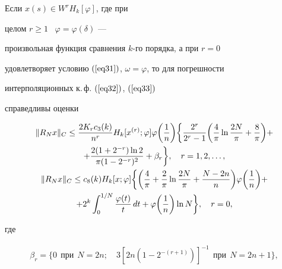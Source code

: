\begin{thm}\label{th4}


Если $x(s)\in W^rH_k[\varphi]$, где при


целом $r\geq1$ \ $\varphi=\varphi(\delta)$ ---


произвольная функция сравнения $k$-го порядка, а при $r=0$


удовлетворяет условию $(\ref{eq31})$, $\omega=\varphi$, то для погрешности


интерполяционных к.\,ф. $(\ref{eq32})$, $(\ref{eq33})$


справедливы оценки


\begin{gather}


\|R_Nx\|_C \leq


\frac{2K_rc_3(k)}{n^r}H_k [x^{(r)};\varphi]


\varphi\bigg(\frac{1}{n}\bigg)\bigg\{\frac{2^r}{2^r-1}


\bigg(\frac{4}{\pi}\ln\frac{2N}{\pi}+\frac{8}{\pi}\bigg) +\notag \\


%


\label{eq36}


+\frac{2(1+2^{-r})\ln2}{\pi(1-2^{-r})^2} +


\beta_r\bigg\}, \quad r=1,2,\dotsc, \\


%


\|R_Nx\|_C \leq c_{8}(k)


H_k[x;\varphi] \bigg\{\bigg(\frac{4}{\pi} +


\frac{2}{\pi}\ln\frac{2N}{\pi} + \frac{N-2n}{n}\bigg)


\varphi\bigg(\frac{1}{n}\bigg) + \notag \\


%


\label{eq37}


+ 2^k\int_0^{1/N}


\frac{\varphi(t)}{t}\,dt + \varphi\bigg(\frac{1}{n} \bigg) \ln N


\bigg\}, \quad r=0,


\end{gather}


где


\begin{gather}\label{eq38}


\beta_r=\{0\ \ \text{при}\ \ N=2n;\quad


3[2n(1-2^{-(r+1)})]^{-1}\ \ \text{при}\ \ N=2n+1\}, \\



\end{gather}
\end{thm}
